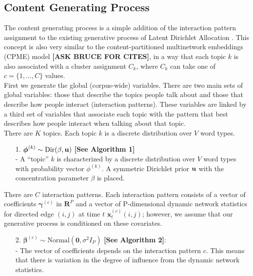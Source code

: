 \documentclass[a4paper]{article}
\begin{document}
\subsection{Content Generating Process} \label{subsec: Content Generating Process}
The content generating process is a simple addition of the interaction pattern assignment to the existing generative process of Latent Dirichlet Allocation \cite{Blei2003}. This concept is also very similar to the content-partitioned multinetwork embeddings (CPME) model {\bf [ASK BRUCE FOR CITES]}, in a way that each topic $k$ is also associated with a cluster assignment $C_k$, where $C_k$ can take one of $c = \{1,...,C\}$ values. \\ \newline
First we generate the global (corpus-wide) variables. There are two main sets of global variables:
those that describe the topics people talk about and those that describe how people interact (interaction patterns). These variables are linked by a third set of variables that associate each topic with the pattern that best describes how people interact when talking about that topic.\\ \newline
There are $K$ topics. Each topic $k$ is a discrete distribution over $V$ word types.
\begin{itemize}
	\item[1.] {$\boldsymbol{\phi}^{(k)} \sim \mbox{Dir}(\beta, \bf u)$} \textbf{[See Algorithm 1]}\\
	- A “topic” $k$ is characterized by a discrete distribution over $V$ word types with probability vector $\phi^{(k)}$. A symmetric Dirichlet prior $\bf u$ with the concentration parameter $\beta$ is placed.
\end{itemize}
\noindent There are $C$ interaction patterns. Each interaction pattern consists of a vector of coefficients $\boldsymbol{\gamma}^{(c)}$ in $\boldsymbol{R}^{P}$ and a vector of P-dimensional dynamic network statistics for directed edge $(i, j)$ at time $t$ $\boldsymbol{x}^{(c)}_t(i, j)$; however, we assume that our generative process is conditioned on these covariates. 
\begin{itemize}
	\item[2.] $\boldsymbol{\beta}^{(c)}\sim \mbox{Normal}(\textbf{0}, \sigma^2I_P)$ \textbf{[See Algorithm 2]}: \\
		- The vector of coefficients depends on the interaction pattern $c$. This means that there is variation in the degree of influence from the dynamic network statistics.
	\end{itemize}
\end{document}
